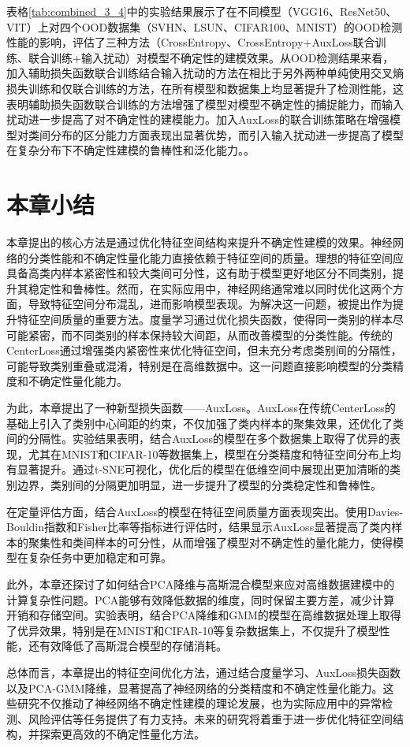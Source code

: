 表格\ref{tab:combined_3_4}中的实验结果展示了在不同模型（VGG16、ResNet50、VIT）上对四个OOD数据集（SVHN、LSUN、CIFAR100、MNIST）的OOD检测性能的影响，评估了三种方法（CrossEntropy、CrossEntropy+AuxLoss联合训练、联合训练+输入扰动）对模型不确定性的建模效果。从OOD检测结果来看，加入辅助损失函数联合训练结合输入扰动的方法在相比于另外两种单纯使用交叉熵损失训练和仅联合训练的方法，在所有模型和数据集上均显著提升了检测性能，这表明辅助损失函数联合训练的方法增强了模型对模型不确定性的捕捉能力，而输入扰动进一步提高了对不确定性的建模能力。加入AuxLoss的联合训练策略在增强模型对类间分布的区分能力方面表现出显著优势，而引入输入扰动进一步提高了模型在复杂分布下不确定性建模的鲁棒性和泛化能力。。

\section{本章小结}
本章提出的核心方法是通过优化特征空间结构来提升不确定性建模的效果。神经网络的分类性能和不确定性量化能力直接依赖于特征空间的质量。理想的特征空间应具备高类内样本紧密性和较大类间可分性，这有助于模型更好地区分不同类别，提升其稳定性和鲁棒性。然而，在实际应用中，神经网络通常难以同时优化这两个方面，导致特征空间分布混乱，进而影响模型表现。为解决这一问题，被提出作为提升特征空间质量的重要方法。度量学习通过优化损失函数，使得同一类别的样本尽可能紧密，而不同类别的样本保持较大间距，从而改善模型的分类性能。传统的CenterLoss通过增强类内紧密性来优化特征空间，但未充分考虑类别间的分隔性，可能导致类别重叠或混淆，特别是在高维数据中。这一问题直接影响模型的分类精度和不确定性量化能力。

为此，本章提出了一种新型损失函数——AuxLoss。AuxLoss在传统CenterLoss的基础上引入了类别中心间距的约束，不仅加强了类内样本的聚集效果，还优化了类间的分隔性。实验结果表明，结合AuxLoss的模型在多个数据集上取得了优异的表现，尤其在MNIST和CIFAR-10等数据集上，模型在分类精度和特征空间分布上均有显著提升。通过t-SNE可视化，优化后的模型在低维空间中展现出更加清晰的类别边界，类别间的分隔更加明显，进一步提升了模型的分类稳定性和鲁棒性。

在定量评估方面，结合AuxLoss的模型在特征空间质量方面表现突出。使用Davies-Bouldin指数和Fisher比率等指标进行评估时，结果显示AuxLoss显著提高了类内样本的聚集性和类间样本的可分性，从而增强了模型对不确定性的量化能力，使得模型在复杂任务中更加稳定和可靠。

此外，本章还探讨了如何结合PCA降维与高斯混合模型来应对高维数据建模中的计算复杂性问题。PCA能够有效降低数据的维度，同时保留主要方差，减少计算开销和存储空间。实验表明，结合PCA降维和GMM的模型在高维数据处理上取得了优异效果，特别是在MNIST和CIFAR-10等复杂数据集上，不仅提升了模型性能，还有效降低了高斯混合模型的存储消耗。

总体而言，本章提出的特征空间优化方法，通过结合度量学习、AuxLoss损失函数以及PCA-GMM降维，显著提高了神经网络的分类精度和不确定性量化能力。这些研究不仅推动了神经网络不确定性建模的理论发展，也为实际应用中的异常检测、风险评估等任务提供了有力支持。未来的研究将着重于进一步优化特征空间结构，并探索更高效的不确定性量化方法。